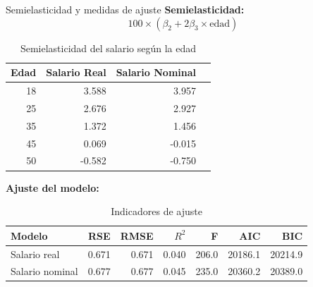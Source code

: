 \documentclass[10pt]{beamer}
\begin{document}
\begin{frame}{Semielasticidad y medidas de ajuste}
\textbf{Semielasticidad:}
\[
100 \times (\beta_2 + 2\beta_3 \times \text{edad})
\]

\begin{table}[ht]
\scriptsize
\centering
\caption*{Semielasticidad del salario según la edad}
\begin{tabular}{rrrr}
\toprule
Edad & Salario Real & Salario Nominal \\
\midrule
18 & 3.588 & 3.957 \\
25 & 2.676 & 2.927 \\
35 & 1.372 & 1.456 \\
45 & 0.069 & -0.015 \\
50 & -0.582 & -0.750 \\
\bottomrule
\end{tabular}
\end{table}

\vspace{0.2cm}
\textbf{Ajuste del modelo:}
\begin{table}[ht]
\scriptsize
\centering
\caption*{Indicadores de ajuste}
\begin{tabular}{lrrrrrr}
\toprule
Modelo & RSE & RMSE & $R^2$ & F & AIC & BIC \\
\midrule
Salario real & 0.671 & 0.671 & 0.040 & 206.0 & 20186.1 & 20214.9 \\
Salario nominal & 0.677 & 0.677 & 0.045 & 235.0 & 20360.2 & 20389.0 \\
\bottomrule
\end{tabular}
\end{table}

\end{frame}
\end{document}
